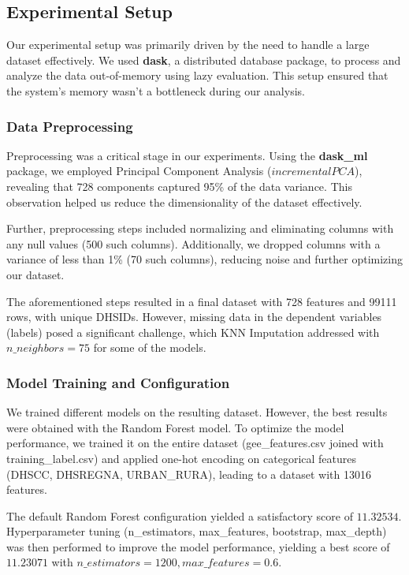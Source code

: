 \documentclass{article}
\begin{document}
\subsection{Experimental Setup}
Our experimental setup was primarily driven by the need to handle a large dataset effectively. We used \textbf{dask}, a distributed database package, to process and analyze the data out-of-memory using lazy evaluation. This setup ensured that the system's memory wasn't a bottleneck during our analysis.

\subsubsection{Data Preprocessing}
Preprocessing was a critical stage in our experiments. Using the \textbf{dask\_ml} package, we employed Principal Component Analysis ($incrementalPCA$), revealing that 728 components captured 95\% of the data variance. This observation helped us reduce the dimensionality of the dataset effectively.

Further, preprocessing steps included normalizing and eliminating columns with any null values (500 such columns). Additionally, we dropped columns with a variance of less than 1\% (70 such columns), reducing noise and further optimizing our dataset. 

The aforementioned steps resulted in a final dataset with 728 features and 99111 rows, with unique DHSIDs. However, missing data in the dependent variables (labels) posed a significant challenge, which KNN Imputation addressed with $n\_neighbors=75$ for some of the models.

\subsubsection{Model Training and Configuration}
We trained different models on the resulting dataset. However, the best results were obtained with the Random Forest model. To optimize the model performance, we trained it on the entire dataset (gee\_features.csv joined with training\_label.csv) and applied one-hot encoding on categorical features (DHSCC, DHSREGNA, URBAN\_RURA), leading to a dataset with 13016 features.

The default Random Forest configuration yielded a satisfactory score of $11.32534$. Hyperparameter tuning (n\_estimators, max\_features, bootstrap, max\_depth) was then performed to improve the model performance, yielding a best score of $11.23071$ with $n\_estimators=1200, max\_features=0.6$.
\end{document}
